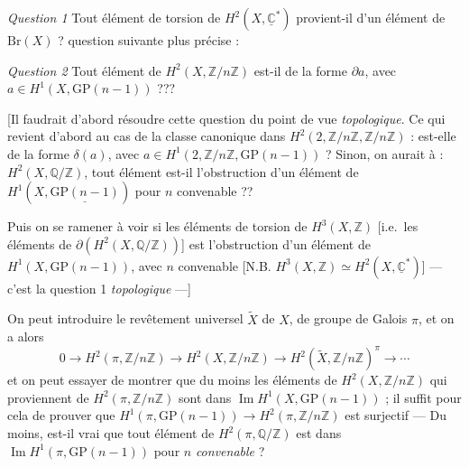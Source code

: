 \documentclass[11pt,a4paper]{article}
\begin{document}
\emph{Question 1} \quad Tout élément de torsion de $H^2(X,
\underline{\mathbb{C}}^{*})$ provient-il d'un élément de $\mathrm{Br}(X)$ ?
 question suivante plus
précise :

\emph{Question 2} \quad Tout élément de $H^2(X, \mathbb{Z}/n\mathbb{Z})$
est-il de la forme $\partial a$, avec $a \in H^1(X, \mathrm{GP}(n-1))$ ???


[Il faudrait d'abord résoudre cette question du point de vue
\emph{topologique}. Ce qui revient d'abord au cas de la classe canonique dans
$H^2(2, \mathbb{Z}/n\mathbb{Z}, \mathbb{Z}/n\mathbb{Z})$ : est-elle de la
forme $\delta(a)$, avec $a \in H^1(2, \mathbb{Z}/n\mathbb{Z},
\mathrm{GP}(n-1))$ ?
Sinon, on aurait  à  : $H^2(X,
\mathbb{Q}/\mathbb{Z})$, tout élément est-il l'obstruction d'un élément de
$H^1(X, \underline{\mathrm{GP}(n-1)})$ pour $n$ convenable ??

Puis on  se ramener à voir si les éléments de
torsion de $H^3(X, \mathbb{Z})$  [i.e.\ les
éléments de $\partial(H^2(X, \mathbb{Q}/\mathbb{Z}))$] est l'obstruction
d'un élément de $H^1(X, \mathrm{GP}(n-1))$, avec $n$ convenable [N.B.
$H^3(X, \mathbb{Z}) \simeq H^2(X, \underline{\mathbb{C}}^{*})$] --- c'est la
question 1 \emph{topologique} ---]

On peut introduire le revêtement universel $\widetilde{X}$ de $X$, de groupe
de Galois $\pi$, et on a alors
\[
  0 \to H^2(\pi, \mathbb{Z}/n\mathbb{Z}) \to H^2(X, \mathbb{Z}/n\mathbb{Z})
  \to H^2(\widetilde{X}, \mathbb{Z}/n\mathbb{Z})^{\pi} \to \cdots
\]
et on peut essayer de montrer que du moins les éléments de $H^2(X,
\mathbb{Z}/n\mathbb{Z})$ qui proviennent de $H^2(\pi, \mathbb{Z}/n\mathbb{Z})$
sont dans $\operatorname{Im} H^1(X, \mathrm{GP}(n-1))$ ; 
il suffit pour cela de prouver que $H^1(\pi, \mathrm{GP}(n-1)) \to H^2(\pi,
\mathbb{Z}/n\mathbb{Z})$ est surjectif ---
Du moins, est-il vrai que tout élément de $H^2(\pi, \mathbb{Q}/\mathbb{Z})$
est dans $\operatorname{Im} H^1(\pi, \mathrm{GP}(n-1))$ pour $n$
\emph{convenable} ?
\end{document}
